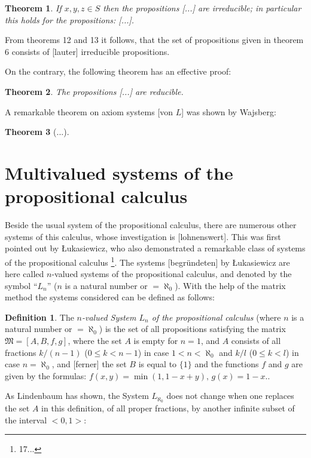 \documentclass{article}
\newtheorem{theorem}{Theorem}
\theoremstyle{definition}
\newtheorem{definition}{Definition}
\begin{document}
\begin{theorem}
  If $x,y,z\in S$ then the propositions [...] are irreducible; in particular this holds for the propositions: [...].
\end{theorem}

From theorems 12 and 13 it follows, that the set of propositions given in theorem 6 consists of [lauter] irreducible propositions.

On the contrary, the following theorem has an effective proof:
\begin{theorem}
  The propositions [...] are reducible.
\end{theorem}

A remarkable theorem on axiom systems [von $L$] was shown by Wajsberg:
\begin{theorem}
  [...]
\end{theorem}

\section{Multivalued systems of the propositional calculus}
Beside the usual system of the propositional calculus, there are numerous other systems of this calculus, whose investigation is [lohnenswert]. This was first pointed out by Łukasiewicz, who also demonstrated a remarkable class of systems of the propositional calculus \footnote{17...}. The systems [begründeten] by Łukasiewicz are here called $n$-valued systems of the propositional calculus, and denoted by the symbol ``$L_n$'' ($n$ is a natural number or $=\aleph_0$). With the help of the matrix method the systems considered can be defined as follows:

\begin{definition}
  The \emph{$n$-valued System $L_n$ of the propositional calculus} (where $n$ is a natural number or $=\aleph_0$) is the set of all propositions satisfying the matrix $\mathfrak{M}=[A,B,f,g]$, where the set $A$ is empty for $n=1$, and $A$ consists of all fractions $k/(n-1)$ ($0\leq k<n-1$) in case $1<n<\aleph_0$ and $k/l$ ($0\leq k<l$) in case $n=\aleph_0$, and [ferner] the set $B$ is equal to $\{1\}$ and the functions $f$ and $g$ are given by the formulas: $f(x,y) = \min(1,1-x+y),\, g(x)=1-x$..
\end{definition}

As Lindenbaum has shown, the System $L_{\aleph_0}$ does not change when one replaces the set $A$ in this definition, of all proper fractions, by another infinite subset of the interval $<0,1>$:
\end{document}
